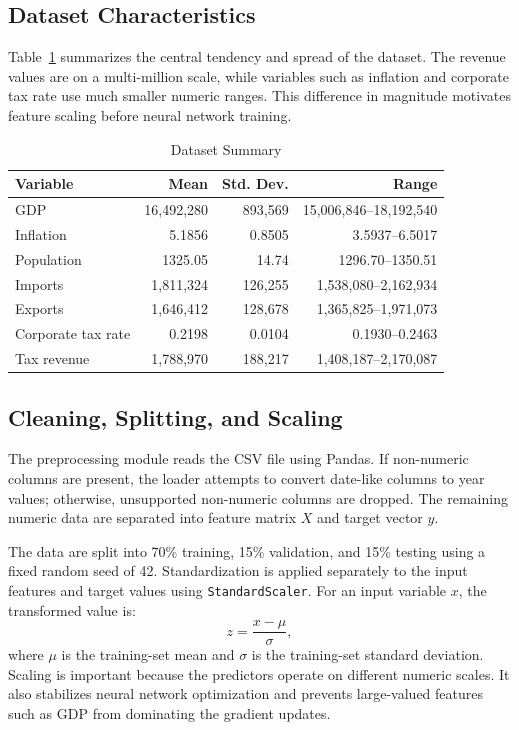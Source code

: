 \documentclass[conference]{IEEEtran}
\begin{document}
\subsection{Dataset Characteristics}
Table~\ref{tab:dataset_summary} summarizes the central tendency and spread of the dataset. The revenue values are on a multi-million scale, while variables such as inflation and corporate tax rate use much smaller numeric ranges. This difference in magnitude motivates feature scaling before neural network training.

\begin{table}[htbp]
\caption{Dataset Summary}
\centering
\begin{tabular}{lrrr}
\toprule
\textbf{Variable} & \textbf{Mean} & \textbf{Std. Dev.} & \textbf{Range} \\
\midrule
GDP & 16,492,280 & 893,569 & 15,006,846--18,192,540 \\
Inflation & 5.1856 & 0.8505 & 3.5937--6.5017 \\
Population & 1325.05 & 14.74 & 1296.70--1350.51 \\
Imports & 1,811,324 & 126,255 & 1,538,080--2,162,934 \\
Exports & 1,646,412 & 128,678 & 1,365,825--1,971,073 \\
Corporate tax rate & 0.2198 & 0.0104 & 0.1930--0.2463 \\
Tax revenue & 1,788,970 & 188,217 & 1,408,187--2,170,087 \\
\bottomrule
\end{tabular}
\label{tab:dataset_summary}
\end{table}

\subsection{Cleaning, Splitting, and Scaling}
The preprocessing module reads the CSV file using Pandas. If non-numeric columns are present, the loader attempts to convert date-like columns to year values; otherwise, unsupported non-numeric columns are dropped. The remaining numeric data are separated into feature matrix $X$ and target vector $y$.

The data are split into 70\% training, 15\% validation, and 15\% testing using a fixed random seed of 42. Standardization is applied separately to the input features and target values using \texttt{StandardScaler}. For an input variable $x$, the transformed value is:
\begin{equation}
    z = \frac{x - \mu}{\sigma},
\end{equation}
where $\mu$ is the training-set mean and $\sigma$ is the training-set standard deviation. Scaling is important because the predictors operate on different numeric scales. It also stabilizes neural network optimization and prevents large-valued features such as GDP from dominating the gradient updates.
\end{document}
